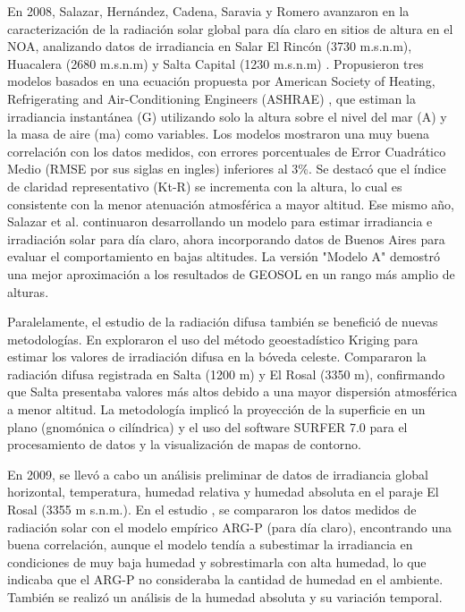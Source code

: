 \documentclass[letterpaper,12pt, twoside]{report}
\providecommand{\DIFdeltex}[1]{{\protect\color{red} \scriptsize #1}} %
\providecommand{\DIFdel}[1]{\texorpdfstring{\DIFdeltex{#1}}{}} %
\begin{document}
\DIFdel{En 2008, Salazar, Hernández, Cadena, Saravia y Romero avanzaron en la caracterización de la radiación solar global para día claro en sitios de altura en el NOA, analizando datos de irradiancia en Salar El Rincón (3730 m.s.n.m), Huacalera (2680 m.s.n.m) y Salta Capital (1230 m.s.n.m) \citep{Salazar2008a}. Propusieron tres modelos basados en una ecuación propuesta por American Society of Heating, Refrigerating and Air-Conditioning Engineers (ASHRAE) \citep{MANI1980}, que estiman la irradiancia instantánea (G) utilizando solo la altura sobre el nivel del mar (A) y la masa de aire (ma) como variables. Los modelos mostraron una muy buena correlación con los datos medidos, con errores porcentuales de Error Cuadrático Medio (RMSE por sus siglas en ingles) inferiores al 3\%. Se destacó que el índice de claridad representativo (Kt-R) se incrementa con la altura, lo cual es consistente con la menor atenuación atmosférica a mayor altitud. Ese mismo año, Salazar et al. continuaron desarrollando un modelo para estimar irradiancia e irradiación solar para día claro, ahora incorporando datos de Buenos Aires para evaluar el comportamiento en bajas altitudes. La versión "Modelo A" demostró una mejor aproximación a los resultados de GEOSOL en un rango más amplio de alturas.}%

\DIFdel{Paralelamente, el estudio de la radiación difusa también se benefició de nuevas metodologías. En \cite{Salazar2008b} exploraron el uso del método geoestadístico Kriging \citep{Krige1951}  para estimar los valores de irradiación difusa en la bóveda celeste. Compararon la radiación difusa registrada en Salta (1200 m) y El Rosal (3350 m), confirmando que Salta presentaba valores más altos debido a una mayor dispersión atmosférica a menor altitud. La metodología implicó la proyección de la superficie en un plano (gnomónica o cilíndrica) y el uso del software SURFER 7.0 para el procesamiento de datos y la visualización de mapas de contorno.}%

\DIFdel{En 2009, se llevó a cabo un análisis preliminar de datos de irradiancia global horizontal, temperatura, humedad relativa y humedad absoluta en el paraje El Rosal (3355 m s.n.m.). En el estudio \cite{Salazar2009}, se compararon los datos medidos de radiación solar con el modelo empírico ARG-P (para día claro), encontrando una buena correlación, aunque el modelo tendía a subestimar la irradiancia en condiciones de muy baja humedad y sobrestimarla con alta humedad, lo que indicaba que el ARG-P no consideraba la cantidad de humedad en el ambiente. También se realizó un análisis de la humedad absoluta y su variación temporal.}%
\end{document}
